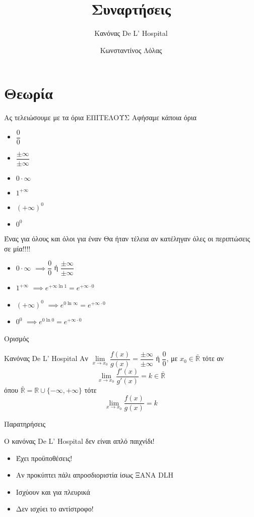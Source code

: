 \documentclass{presentation}
\title{Συναρτήσεις}
\subtitle{Κανόνας De L' Hospital}
\author[Λόλας]{Κωνσταντίνος Λόλας}
\institute[$10^ο$ ΓΕΛ]{$10^ο$ ΓΕΛ Θεσσαλονίκης}
\begin{document}
\begin{frame}
  \titlepage
\end{frame}

\section{Θεωρία}
\begin{frame}{Ας τελειώσουμε με τα όρια ΕΠΙΤΕΛΟΥΣ}
  Αφήσαμε κάποια όρια
  \begin{itemize}
    \item $\dfrac{0}{0}$
    \item $\dfrac{\pm\infty}{\pm\infty}$
    \item $0\cdot \infty$
    \item $1^{+\infty}$
    \item $(+\infty)^0$
    \item $0^0$
  \end{itemize}
\end{frame}

\begin{frame}{Ένας για όλους και όλοι για έναν}
  Θα ήταν τέλεια αν κατέληγαν όλες οι περιπτώσεις σε μία!!!!
  \begin{itemize}
    \item<1-> $0\cdot \infty$ $\implies \dfrac{0}{0}$ ή $\dfrac{\pm\infty}{\pm\infty}$
    \item<3-> $1^{+\infty}$  $\implies e^{+\infty\ln 1}=e^{+\infty\cdot 0}$
    \item<5-> $(+\infty)^0$  $\implies e^{0\ln\infty}=e^{+\infty\cdot 0}$
    \item<7-> $0^0$  $\implies e^{0\ln 0}=e^{+\infty\cdot 0}$
  \end{itemize}
\end{frame}

\begin{frame}{Ορισμός}
  \begin{block}{Κανόνας De L' Hospital}
    Αν $\lim\limits_{x \to x_0}{ \dfrac{f(x)}{g(x)} }=\dfrac{\pm\infty}{\pm\infty}$ ή $\dfrac{0}{0}$, με $x_0\in\bar{\mathbb{R}}$ τότε αν
    $$\lim\limits_{x \to x_0}{ \dfrac{f'(x)}{g'(x)} }=k\in\bar{\mathbb{R}}$$
    όπου $\bar{\mathbb{R}}=\mathbb{R}\cup \{-\infty,+\infty\}$ τότε
    $$\lim\limits_{x \to x_0}{ \dfrac{f(x)}{g(x)} }=k$$
  \end{block}
\end{frame}

\begin{frame}{Παρατηρήσεις}

  Ο κανόνας De L' Hospital δεν είναι απλό παιχνίδι!

  \begin{itemize}[<+->]
    \item Έχει προϋποθέσεις!
    \item Αν προκύπτει πάλι απροσδιοριστία ίσως ΞΑΝΑ DLH
    \item Ισχύουν και για πλευρικά
    \item Δεν ισχύει το αντίστροφο!
  \end{itemize}

\end{frame}
\end{document}
